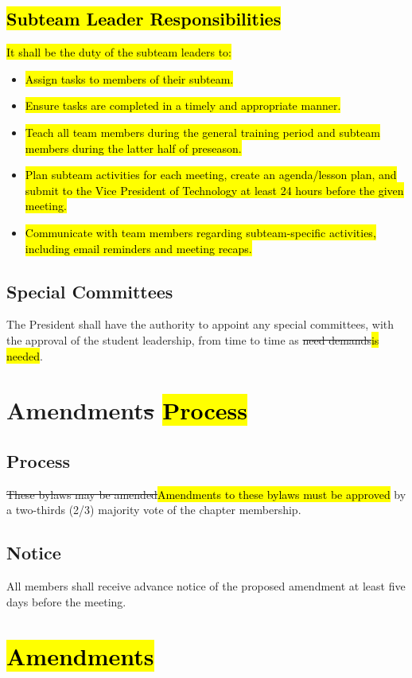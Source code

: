 \documentclass[12pt, a4paper]{article}
\begin{document}
\subsection{\hl{Subteam Leader Responsibilities}}
\hl{It shall be the duty of the subteam leaders to:}
\begin{itemize}
\item \hl{Assign tasks to members of their subteam.}
\item \hl{Ensure tasks are completed in a timely and appropriate manner.}
\item \hl{Teach all team members during the general training period and subteam members during the latter half of preseason.}
\item \hl{Plan subteam activities for each meeting, create an agenda/lesson plan, and submit to the Vice President of Technology at least 24 hours before the given meeting.}
\item \hl{Communicate with team members regarding subteam-specific activities, including email reminders and meeting recaps.}
\end{itemize}

\subsection{Special Committees}
The President shall have the authority to appoint any special committees, with the approval of the student leadership, from time to time as \st{need demands}\hl{is needed}.

\section{Amendment\st{s} \hl{Process}}
\subsection{Process}
\st{These bylaws may be amended}\hl{Amendments to these bylaws must be approved} by a two-thirds (2/3) majority vote of the chapter membership.

\subsection{Notice}
All members shall receive advance notice of the proposed amendment at least five days before the meeting. 

\section{\hl{Amendments}}
\end{document}
